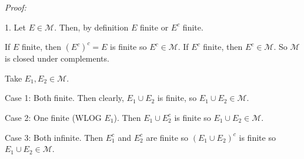 \documentclass[12pt]{article}
\newcommand{\M}{\mathcal{M}}
\newenvironment*{tbox}[2][gray]{
    \begin{tcolorbox}[
        parbox=false,
        colback=#1!5!white,
        colframe=#1!75!black,
        breakable,
        title={#2}
    ]}
    {\end{tcolorbox}}
\begin{document}
\begin{tbox}[red]{Let $X$ be uncountable. Let $\M = \{E \text{ is finite or } E^c \text{ is finite}\}$. Define 
    \[\mu(E) = \begin{cases}
        0 & E \text{ is countable}\\ 
        1 & E^c \text{ is countable}
    \end{cases}\]
    Check that $\M$ is a $\sigma$-algebra and that $\mu$ is a measure}
    \emph{Proof:} 

    1. Let $E \in \M$. Then, by definition $E$ finite or $E^c$ finite. 

    If $E$ finite, then $(E^c)^c = E$ is finite so $E^c \in \M$. If $E^c$ finite, then $E^c \in \M$. So $\M$ is closed under complements. 

    Take $E_1, E_2 \in \M$. 

    Case 1: Both finite. Then clearly, $E_1 \cup E_2$ is finite, so $E_1 \cup E_2 \in \M$. 

    Case 2: One finite (WLOG $E_1$). Then $E_1 \cup E_2^c$ is finite so $E_1 \cup E_2 \in \M$.

    Case 3: Both infinite. Then $E_1^c$ and $E_2^c$ are finite so $(E_1 \cup E_2)^c$ is finite so $E_1 \cup E_2 \in \M$.

\end{tbox}
\end{document}
